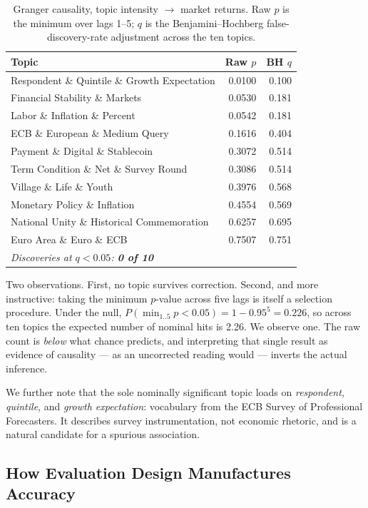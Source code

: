 \documentclass[11pt]{article}
\begin{document}
\begin{table}[H]
\centering
\caption{Granger causality, topic intensity $\rightarrow$ market returns. Raw $p$ is the minimum over lags 1--5; $q$ is the Benjamini--Hochberg \cite{benjamini1995} false-discovery-rate adjustment across the ten topics.}
\label{tab:granger}
\begin{tabular}{lrr}
\toprule
\textbf{Topic} & \textbf{Raw $p$} & \textbf{BH $q$} \\
\midrule
Respondent \& Quintile \& Growth Expectation & 0.0100 & 0.100 \\
Financial Stability \& Markets & 0.0530 & 0.181 \\
Labor \& Inflation \& Percent & 0.0542 & 0.181 \\
ECB \& European \& Medium Query & 0.1616 & 0.404 \\
Payment \& Digital \& Stablecoin & 0.3072 & 0.514 \\
Term Condition \& Net \& Survey Round & 0.3086 & 0.514 \\
Village \& Life \& Youth & 0.3976 & 0.568 \\
Monetary Policy \& Inflation & 0.4554 & 0.569 \\
National Unity \& Historical Commemoration & 0.6257 & 0.695 \\
Euro Area \& Euro \& ECB & 0.7507 & 0.751 \\
\midrule
\multicolumn{3}{l}{\textit{Discoveries at $q < 0.05$: \textbf{0 of 10}}} \\
\bottomrule
\end{tabular}
\end{table}

Two observations. First, no topic survives correction. Second, and more instructive: taking the minimum $p$-value across five lags is itself a selection procedure. Under the null, $P(\min_{1..5} p < 0.05) = 1 - 0.95^5 = 0.226$, so across ten topics the expected number of nominal hits is 2.26. We observe one. The raw count is \textit{below} what chance predicts, and interpreting that single result as evidence of causality --- as an uncorrected reading would --- inverts the actual inference.

We further note that the sole nominally significant topic loads on \textit{respondent}, \textit{quintile}, and \textit{growth expectation}: vocabulary from the ECB Survey of Professional Forecasters. It describes survey instrumentation, not economic rhetoric, and is a natural candidate for a spurious association.

\subsection{How Evaluation Design Manufactures Accuracy}
\end{document}
